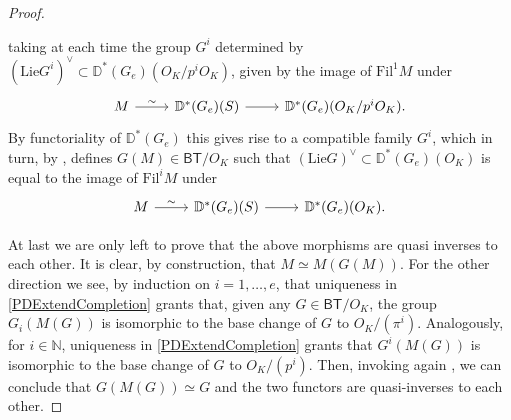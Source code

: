 \begin{proof}
\begin{enumerate}
	taking at each time the group $G^i$ determined by $(\mathrm{Lie} G^i)^\vee \subset
	\mathbb{D}^*(G_e)(O_K/p^iO_K)$, given by the image of $\mathrm{Fil}^1 M$ under
	\begin{equation*}
	\begin{tikzcd}
		M \arrow[r, "\sim", rightarrow] &
		\mathbb{D}^*(G_e)(S) \arrow[r, "", rightarrow] &
		\mathbb{D}^*(G_e)(O_K/p^iO_K)
	.\end{tikzcd}
	\end{equation*}
	By functoriality of $\mathbb{D}^*(G_e)$ this gives rise to a compatible family $G^i$,
	which in turn, by \cite[Lemma 2.4.4]{deJong}, defines $G(M) \in \mathsf{BT}/O_K$
	such that $(\mathrm{Lie}G)^\vee \subset \mathbb{D}^*(G_e)(O_K)$ is
	equal to the image of $\mathrm{Fil}^iM$ under
	\begin{equation*}
	\begin{tikzcd}
		M \arrow[r, "\sim", rightarrow] &
		\mathbb{D}^*(G_e)(S) \arrow[r, "", rightarrow] &
		\mathbb{D}^*(G_e)(O_K)
	.\end{tikzcd}
	\end{equation*}
\end{enumerate}
At last we are only left to prove that the above morphisms are quasi inverses to each other.
It is clear, by construction, that $M \simeq M(G(M))$.
For the other direction we see, by induction on $i = 1, \ldots, e$, that uniqueness in
\cref{PDExtendCompletion} grants that, given any $G \in \mathsf{BT}/O_K$, 
the group $G_i(M(G))$ is isomorphic to the base change of $G$ to $O_K/ (\pi^i)$.
Analogously, for $i \in \mathbb{N}$, uniqueness in \cref{PDExtendCompletion} grants
that $G^i(M(G))$ is isomorphic to the base change of $G$ to $O_K/ (p^i)$.
Then, invoking again \cite[Lemma 2.4.4]{deJong}, we can conclude that $G(M(G)) \simeq G$
and the two functors are quasi-inverses to each other.
\end{proof}


